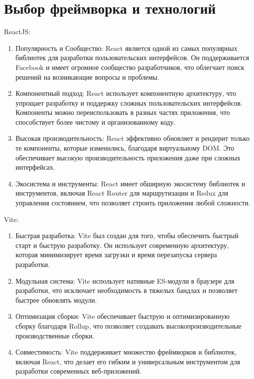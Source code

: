 \documentclass[a4paper,12pt]{article}
\begin{document}
	\newpage
	\section{Выбор фреймворка и технологий}
		ReactJS:
		\begin{enumerate}
			\item Популярность и Сообщество: React является одной из самых популярных библиотек для разработки пользовательских интерфейсов.
			Он поддерживается Facebook и имеет огромное сообщество разработчиков, что облегчает поиск решений на возникающие вопросы и проблемы.

			\item Компонентный подход: React использует компонентную архитектуру, что упрощает разработку и поддержку сложных пользовательских интерфейсов.
			Компоненты можно переиспользовать в разных частях приложения, что способствует более чистому и организованному коду.

			\item Высокая производительность: React эффективно обновляет и рендерит только те компоненты, которые изменились, благодаря виртуальному DOM\@.
			Это обеспечивает высокую производительность приложения даже при сложных интерфейсах.

			\item Экосистема и инструменты: React имеет обширную экосистему библиотек и инструментов, включая React Router для маршрутизации и Redux для управления состоянием, что позволяет строить приложения любой сложности.

		\end{enumerate}


		Vite:
		\begin{enumerate}
			\item Быстрая разработка: Vite был создан для того, чтобы обеспечить быстрый старт и быструю разработку.
			Он использует современную архитектуру, которая минимизирует время загрузки и время перезапуска сервера разработки.


			\item Модульная система: Vite использует нативные ES-модули в браузере для разработки, что исключает необходимость в тяжелых бандлах и позволяет быстрее обновлять модули.

			\item Оптимизация сборки: Vite обеспечивает быструю и оптимизированную сборку благодаря Rollup, что позволяет создавать высокопроизводительные производственные сборки.

			\item Совместимость: Vite поддерживает множество фреймворков и библиотек, включая React, что делает его гибким и универсальным инструментом для разработки современных веб-приложений.

		\end{enumerate}
\end{document}
